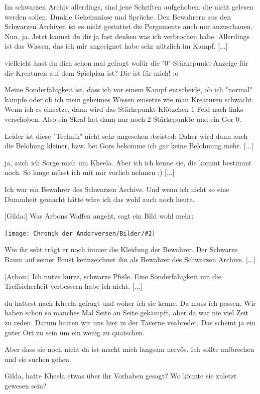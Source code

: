 \documentclass[10pt, a4paper, oneside]{book}
\newcommand{\bildmitts}[2][height=0.32\textwidth,width=0.48\textwidth,keepaspectratio]{%
    \begin{center}
        \texttt{[image: Chronik der Andorversen/Bilder/\#2]}
    \end{center}
}
\begin{document}
\begin{multicols}{2}
Im schwarzen Archiv allerdings, sind jene Schriften aufgehoben, die nicht gelesen werden sollen. Dunkle Geheimnisse und Sprüche. Den Bewahrern aus den Schwarzen Archiven ist es nicht gestattet die Pergamente auch nur anzuschauen. Nun, ja. Jetzt kannst du dir ja fast denken was ich verbrochen habe. Allerdings ist das Wissen, das ich mir angeeignet habe sehr nützlich im Kampf. [...]

vielleicht hast du dich schon mal gefragt wofür die "0"-Stärkepunkt-Anzeige für die Kreaturen auf dem Spielplan ist? Die ist für mich! :o

Meine Sonderfähigkeit ist, dass ich vor einem Kampf entscheide, ob ich "normal" kämpfe oder ob ich mein geheimes Wissen einsetze wie man Kreaturen schwächt. Wenn ich es einsetze, dann wird das Stärkepunkt Klötzchen 1 Feld nach links verschoben. Also ein Skral hat dann nur noch 2 Stärkepunkte und ein Gor 0.

Leider ist diese "Technik" nicht sehr angesehen :twisted: Daher wird dann auch die Belohung kleiner, bzw. bei Gors bekomme ich gar keine Belohnung mehr. [...]

ja, auch ich Sorge mich um Kheela. Aber ich ich kenne sie, die kommt bestimmt noch. So lange müsst ich mit mir vorlieb nehmen ;) [...]

Ich war ein Bewahrer des Schwarzen Archivs. Und wenn ich nicht so eine Dummheit gemacht hätte wäre ich das wohl auch noch heute.

[Gilda:] Was Arbons Waffen angeht, sagt ein Bild wohl mehr:

\bildmitts{NH Taverne Bild 2.jpg}

Wie ihr seht trägt er noch immer die Kleidung der Bewahrer. Der Schwarze Baum auf seiner Brust kennzeichnet ihn als Bewahrer des Schwarzen Archivs. [...]

[Arbon:] Ich nutze kurze, schwarze Pfeile. Eine Sonderfähigkeit um die Treffsicherheit verbessern habe ich nicht. [...]

du hattest nach Kheela gefragt und woher ich sie kenne. Da muss ich passen. Wir haben schon so manches Mal Seite an Seite gekämpft, aber da war nie viel Zeit zu reden. Darum hatten wir uns hier in der Taverne veabredet. Das scheint ja ein guter Ort zu sein um ein wenig zu quatschen.

Aber dass sie noch nicht da ist macht mich langsam nervös. Ich sollte aufbrechen und sie suchen gehen.

Gilda, hatte Kheela etwas über ihr Vorhaben gesagt? Wo könnte sie zuletzt gewesen sein?



\end{multicols}
\end{document}
